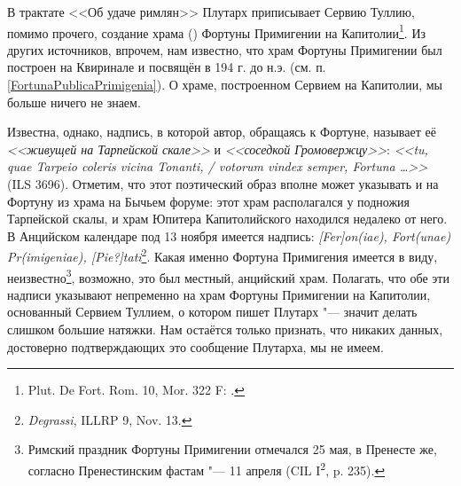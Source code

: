 
В трактате <<Об удаче римлян>> Плутарх приписывает Сервию Туллию, помимо прочего, создание храма () Фортуны Примигении на Капитолии\footnote{Plut. De Fort. Rom. 10, Mor. 322 F: .}. Из других источников, впрочем, нам известно, что храм Фортуны Примигении был построен на Квиринале и посвящён в 194 г. до н.э. (см. п. \ref{FortunaPublicaPrimigenia}). О храме, построенном Сервием на Капитолии, мы больше ничего не знаем.

Известна, однако, надпись, в которой автор, обращаясь к Фортуне, называет её \textit{<<живущей на Тарпейской скале>>} и \textit{<<соседкой Громовержцу>>}: \textit{<<tu, quae Tarpeio coleris vicina Tonanti, / votorum vindex semper, Fortuna \ldots{}>>} (ILS 3696). Отметим, что этот поэтический образ вполне может указывать и на Фортуну из храма на Бычьем форуме: этот храм располагался у подножия Тарпейской скалы, и храм Юпитера Капитолийского находился недалеко от него. В Анцийском календаре под 13 ноября имеется надпись: \textit{[Fer]on(iae), Fort(unae) Pr(imigeniae), [Pie?]tati}\footnote{\textit{Degrassi}, ILLRP 9, Nov. 13.}. Какая именно Фортуна Примигения имеется в виду, неизвестно\footnote{Римский праздник Фортуны Примигении отмечался 25 мая, в Пренесте же, согласно Пренестинским фастам "--- 11 апреля (CIL I\textsuperscript{2}, p. 235).}, возможно, это был местный, анцийский храм. Полагать, что обе эти надписи указывают непременно на храм Фортуны Примигении на Капитолии, основанный Сервием Туллием, о котором пишет Плутарх "--- значит делать слишком большие натяжки. Нам остаётся только признать, что никаких данных, достоверно подтверждающих это сообщение Плутарха, мы не имеем.


